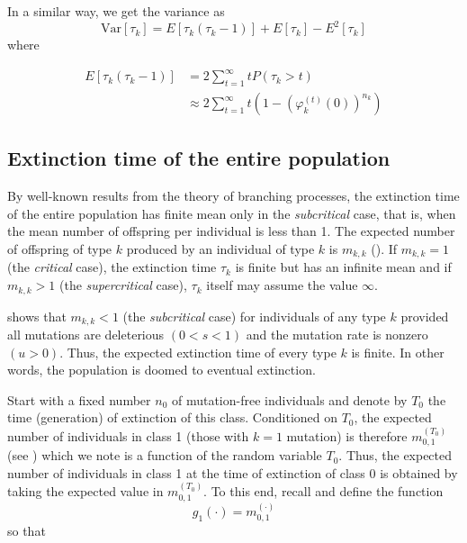\documentclass[9pt,lineno]{elife}
\begin{document}
In a similar way, we get the variance as
%
\begin{equation}
\mathrm{Var}[\tau_{k}]=E[\tau_{k}(\tau_{k}-1)]+E[\tau_{k}]-E^{2}[\tau_{k}]
\label{eq:vartauk}
\end{equation}
%
where

\begin{align*}
%
E[\tau_{k}(\tau_{k}-1)] & =  2\sum_{t=1}^{\infty}tP(\tau_{k}>t)\\[5pt]
& \approx  2\sum_{t=1}^{\infty}t\left(1-\left(\varphi_{k}^{(t)}(0)\right)^{n_k}\right)
%
\end{align*}


\subsection{Extinction time of the entire population}


By well-known results from the theory of branching processes, the extinction time of the entire population has finite mean only in the {\em subcritical} case, that is, when the mean number of offspring per individual is less than 1. 
The expected number of offspring of type $k$ produced by an individual of type $k$ is $m_{k,k}$ ().  
If $m_{k,k}=1$ (the \emph{critical} case), the extinction time $\tau_k$ is finite but has an infinite mean and if $m_{k,k} > 1$ (the {\em supercritical} case), $\tau_k$ itself may assume the value $\infty$.  

 shows that $m_{k,k} < 1$ (the {\em subcritical} case) for individuals of any type $k$ provided all mutations are deleterious $(0<s<1)$ and the mutation rate is nonzero $(u>0)$.  Thus, the expected extinction time of every type $k$ is finite.  
In other words, the population is doomed to eventual extinction.

Start with a fixed number $n_{0}$ of mutation-free individuals and denote by $T_{0}$ the time (generation) of extinction of this class. Conditioned on $T_{0}$, the expected number of individuals in class 1 (those with $k=1$ mutation) is therefore $m_{0,1}^{(T_0)}$
% 
% 
(see )
which we note is a function of the random variable $T_{0}$. Thus, the expected number of individuals in class 1 at the time of extinction of class 0 is obtained by taking the expected value in $m_{0,1}^{(T_0)}$. To this end, recall  and define the function 
%
\[ g_1(\cdot)=m_{0,1}^{(\cdot)} \]
%
so that 
\end{document}
